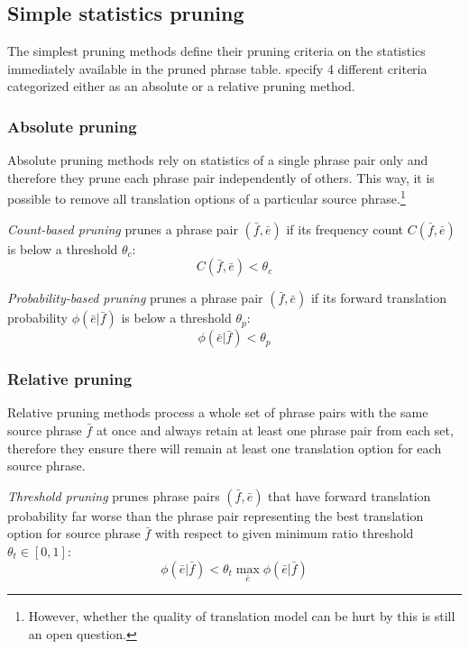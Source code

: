 \subsection{Simple statistics pruning}
\label{sec:simple-statistics-pruning}

The simplest pruning methods define their pruning criteria on the statistics immediately
available in the pruned phrase table. \citet{zens:systcomp} specify 4 different criteria
categorized either as an absolute or a relative pruning method.

\subsubsection*{Absolute pruning}

Absolute pruning methods rely on statistics of a single phrase pair only and therefore
they prune each phrase pair independently of others.
This way, it is possible to remove all translation options of a particular source
phrase.\footnote{However, whether the quality of translation model can be hurt by this is
still an open question.}

\emph{Count-based pruning} prunes a phrase pair $(\bar{f},\bar{e})$ if its frequency count
$C(\bar{f},\bar{e})$ is below a threshold $\theta_{c}$:
\begin{equation} \label{eq:count-based-pruning}
  C(\bar{f},\bar{e}) < \theta_{c}
\end{equation}

\emph{Probability-based pruning} prunes a phrase pair $(\bar{f},\bar{e})$ if its forward
translation probability $\phi(\bar{e}|\bar{f})$ is below a threshold $\theta_{p}$:
\begin{equation}
  \phi(\bar{e}|\bar{f}) < \theta_{p}
\end{equation}

\subsubsection*{Relative pruning}

Relative pruning methods process a whole set of phrase pairs with the same source phrase
$\bar{f}$ at once and always retain at least one phrase pair from each set, therefore they
ensure there will remain at least one translation option for each source phrase.

\emph{Threshold pruning} prunes phrase pairs $(\bar{f},\bar{e})$ that have forward translation
probability far worse than the phrase pair representing the best translation option for source
phrase $\bar{f}$ with respect to given minimum ratio threshold $\theta_{t} \in [0,1]$:
\begin{equation}
  \phi(\bar{e}|\bar{f}) < \theta_{t} \max_{\bar{e}}{\phi(\bar{e}|\bar{f})}
\end{equation}

